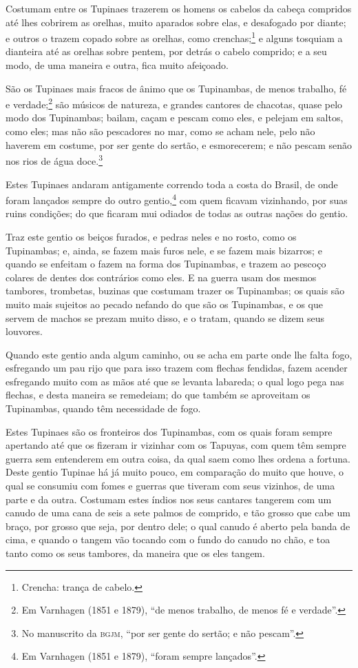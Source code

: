 \mbox{Costumam} entre os Tupinaes trazerem os homens os cabelos da cabeça compridos até lhes
cobrirem as orelhas, muito aparados sobre elas, e desafogado por diante; e outros o trazem
copado sobre as orelhas, como crenchas;\footnote{ Crencha: trança de cabelo.} e alguns
tosquiam a dianteira até as orelhas sobre pentem, por detrás o cabelo comprido; e a seu
modo, de uma maneira e outra, fica muito afeiçoado.

São os Tupinaes mais fracos de ânimo que os Tupinambas, de menos trabalho, fé e
verdade;\footnote{ Em Varnhagen (1851 e 1879), ``de menos trabalho, de menos fé e
verdade''.} são músicos de natureza, e grandes cantores de chacotas, quase pelo modo dos
Tupinambas; bailam, caçam e pescam como eles, e pelejam em saltos, como eles; mas não são
pescadores no mar, como se acham nele, pelo não haverem em costume, por ser gente do
sertão, e esmorecerem; e não pescam senão nos rios de água doce.\footnote{ No manuscrito
da \textsc{bgjm}, ``por ser gente do sertão; e não pescam''.}

Estes Tupinaes andaram antigamente correndo toda a costa do Brasil, de onde foram lançados
sempre do outro gentio,\footnote{ Em Varnhagen (1851 e 1879), ``foram sempre lançados''.}
com quem ficavam vizinhando, por suas ruins condições; do que ficaram mui odiados de todas
as outras nações do gentio.

Traz este gentio os beiços furados, e pedras neles e no rosto, como os Tupinambas; e,
ainda, se fazem mais furos nele, e se fazem mais bizarros; e quando se enfeitam o fazem na
forma dos Tupinambas, e trazem ao pescoço colares de dentes dos contrários como eles. E na
guerra usam dos mesmos tambores, trombetas, buzinas que costumam trazer os Tupinambas; os
quais são muito mais sujeitos ao pecado nefando do que são os Tupinambas, e os que servem
de machos se prezam muito disso, e o tratam, quando se dizem seus louvores.

Quando este gentio anda algum caminho, ou se acha em parte onde lhe falta fogo, esfregando
um pau rijo que para isso trazem com flechas fendidas, fazem acender esfregando muito com
as mãos até que se levanta labareda; o qual logo pega nas flechas, e desta maneira se
remedeiam; do que também se aproveitam os Tupinambas, quando têm necessidade de fogo.

Estes Tupinaes são os fronteiros dos Tupinambas, com os quais foram sempre apertando até
que os fizeram ir vizinhar com os Tapuyas, com quem têm sempre guerra sem entenderem em
outra coisa, da qual saem como lhes ordena a fortuna. Deste gentio Tupinae há já muito
pouco, em comparação do muito que houve, o qual se consumiu com fomes e guerras que
tiveram com seus vizinhos, de uma parte e da outra. Costumam estes índios nos seus
cantares tangerem com um canudo de uma cana de seis a sete palmos de comprido, e tão
grosso que cabe um braço, por grosso que seja, por dentro dele; o qual canudo é aberto
pela banda de cima, e quando o tangem vão tocando com o fundo do canudo no chão, e toa
tanto como os seus tambores, da maneira que os eles tangem.

